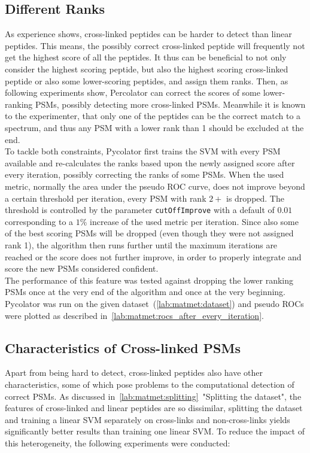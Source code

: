 \subsection{Different Ranks}
\label{lab:matmet:ranks}
As experience shows, cross-linked peptides can be harder to detect than linear peptides. This means, the possibly correct cross-linked peptide will frequently not get the highest score of all the peptides. It thus can be beneficial to not only consider the highest scoring peptide, but also the highest scoring cross-linked peptide or also some lower-scoring peptides, and assign them ranks. Then, as following experiments show, Percolator can correct the scores of some lower-ranking PSMs, possibly detecting more cross-linked PSMs. Meanwhile it is known to the experimenter, that only one of the peptides can be the correct match to a spectrum, and thus any PSM with a lower rank than 1 should be excluded at the end.\\
To tackle both constraints, Pycolator first trains the SVM with every PSM available and re-calculates the ranks based upon the newly assigned score after every iteration, possibly correcting the ranks of some PSMs. When the used metric, normally the area under the pseudo ROC curve, does not improve beyond a certain threshold per iteration, every PSM with rank $2+$ is dropped. The threshold is controlled by the parameter \texttt{cutOffImprove} with a default of $0.01$ corresponding to a $1\%$ increase of the used metric per iteration. Since also some of the best scoring PSMs will be dropped (even though they were not assigned rank 1), the algorithm then runs further until the maximum iterations are reached or the score does not further improve, in order to properly integrate and score the new PSMs considered confident.\\
The performance of this feature was tested against dropping the lower ranking PSMs once at the very end of the algorithm and once at the very beginning. Pycolator was run on the given dataset~(\ref{lab:matmet:dataset}) and pseudo ROCs were plotted as described in~\ref{lab:matmet:rocs_after_every_iteration}.
\subsection{Characteristics of Cross-linked PSMs}
Apart from being hard to detect, cross-linked peptides also have other characteristics, some of which pose problems to the computational detection of correct PSMs. As discussed in~\ref{lab:matmet:splitting}~"Splitting the dataset", the features of cross-linked and linear peptides are so dissimilar, splitting the dataset and training a linear SVM separately on cross-links and non-cross-links yields significantly better results than training one linear SVM. To reduce the impact of this heterogeneity, the following experiments were conducted:

